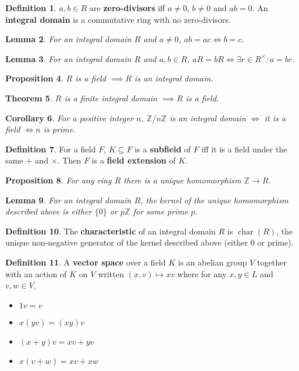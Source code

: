 \documentclass[12pt]{article}
\newtheorem{thm}{Theorem}[section]
\newtheorem{lem}[thm]{Lemma}
\newtheorem{cor}[thm]{Corollary}
\newtheorem{prop}[thm]{Proposition}
\theoremstyle{definition}
\newtheorem{defn}[thm]{Definition}
\newcommand{\Z}{\mathbb{Z}}
\DeclareMathOperator{\chr}{char}
\begin{document}
\begin{defn}
  $a, b \in R$ are \textbf{zero-divisors} iff $a \neq 0$, $b \neq 0$ and $ab = 0$.
  An \textbf{integral domain} is a commutative ring with no zero-divisors.
\end{defn}

\begin{lem}
  For an integral domain $R$ and $a \neq 0$, $ab = ac \iff b = c$.
\end{lem}

\begin{lem}
  For an integral domain $R$ and $a, b \in R$, $aR = bR \iff \exists r \in R^{\times} : a = br$.
\end{lem}

\begin{prop}
  $R$ is a field $\implies R$ is an integral domain.
\end{prop}

\begin{thm}
  $R$ is a finite integral domain $\implies R$ is a field.
\end{thm}

\begin{cor}
  For a positive integer $n$, $\Z / n\Z$ is an integral domain $\iff$ it is a field $\iff n$ is prime.
\end{cor}

\begin{defn}
  For a field $F$, $K \subseteq F$ is a \textbf{subfield} of $F$ iff it is a field under the same $+$ and $\times$.
  Then $F$ is a \textbf{field extension} of $K$.
\end{defn}

\begin{prop}
  For any ring $R$ there is a unique homomorphism $\Z \to R$.
\end{prop}

\begin{lem}
  For an integral domain $R$, the kernel of the unique homomorphism described above is either $\{0\}$ or $p\Z$ for some prime $p$.
\end{lem}

\begin{defn}
  The \textbf{characteristic} of an integral domain $R$ is $\chr(R)$, the unique non-negative generator of the kernel described above (either 0 or prime).
\end{defn}

\begin{defn}
  A \textbf{vector space} over a field $K$ is an abelian group $V$ together with an action of $K$ on $V$ written $(x, v) \mapsto xv$ where for any $x, y \in L$ and $v, w \in V$,
  \begin{itemize}
    \item $1v = v$
    \item $x(yv) = (xy)v$
    \item $(x + y)v = xv + yv$
    \item $x(v + w) = xv + xw$
  \end{itemize}
\end{defn}
\end{document}
